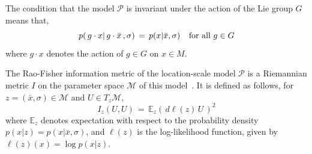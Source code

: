 \documentclass{svmult}
\begin{document}
The condition that the model $\mathcal{P}$ is invariant under the action of the Lie group $G$ means that, 
\begin{equation} \label{eq:invariance}
  p(\,g\cdot x|\,g\cdot\bar{x}\,,\sigma) \,=\,p(x|\bar{x},\sigma) \hspace{0.25cm} \text{ for all } g \in G
\end{equation}
where $g\cdot x$ denotes the action of $g \in G$ on $x \in M$. 

The Rao-Fisher information metric of the location-scale model $\mathcal{P}$ is a Riemannian metric $I$ on the parameter space $\mathcal{M}$ of this model~\cite{amari}.  It is defined as follows, for $z =(\bar{x},\sigma) \in \mathcal{M}$ and $U\in T_z\mathcal{M}$,
\begin{equation} \label{eq:rao}
  I_z(U,U) \,=\, \mathbb{E}_z\left( \,d\ell(z)\,U\,\right)^2 
\end{equation}
where $\mathbb{E}_z$ denotes expectation with respect to the probability density $p(x|z) = p(x|\bar{x},\sigma)$, and $\ell(z)$ is the log-likelihood function,
given by $\ell(z)(x) = \log p(x|z)$.  
\end{document}
